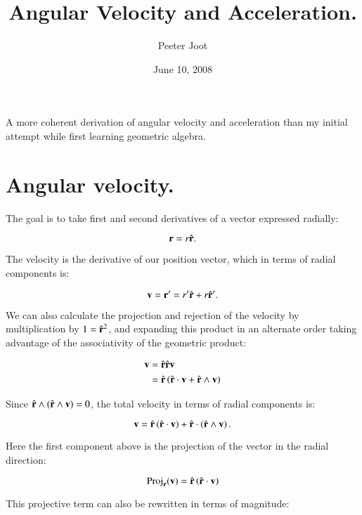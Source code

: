 \documentclass{article}      %
\title{ Angular Velocity and Acceleration. } %
\author{Peeter Joot}         %
\date{June 10, 2008}        %
\begin{document}

\maketitle{}

A more coherent derivation of angular velocity and acceleration than
my initial attempt while first learning geometric algebra.

\section{ Angular velocity. }

The goal is to take first and second derivatives of a vector expressed radially:

\begin{equation}
\mathbf{r} = r \hat{\mathbf{r}}.
\end{equation}

The velocity is the derivative of our position vector, which in terms of radial components is:

\begin{equation}\label{eqn:velocityasrcapprime}
\mathbf{v} = \mathbf{r}' = r' \hat{\mathbf{r}} + r \hat{\mathbf{r}}'.
\end{equation}

We can also calculate the projection and rejection of the velocity by multiplication by $1 = \hat{\mathbf{r}}^2$, and expanding
this product in an alternate order taking advantage of the associativity of the geometric product:

\begin{align*}
\mathbf{v} &= \hat{\mathbf{r}} \hat{\mathbf{r}} \mathbf{v} \\
    &= \hat{\mathbf{r}} \left ( \hat{\mathbf{r}} \cdot \mathbf{v} + \hat{\mathbf{r}} \wedge \mathbf{v} \right) \\
\end{align*}

Since $\hat{\mathbf{r}} \wedge (\hat{\mathbf{r}} \wedge \mathbf{v}) = 0$, the total velocity in terms of radial components is:

\begin{equation}\label{eqn:velocityprojrej}
\mathbf{v} = \hat{\mathbf{r}} \left(\hat{\mathbf{r}} \cdot \mathbf{v}\right) + \hat{\mathbf{r}} \cdot \left(\hat{\mathbf{r}} \wedge \mathbf{v}\right).
\end{equation}

Here the first component above is the projection of the vector in the radial direction:

\[
\operatorname{Proj}_{\mathbf{r}}(\mathbf{v}) = \hat{\mathbf{r}} \left(\hat{\mathbf{r}} \cdot \mathbf{v}\right)
\]

This projective term can also be rewritten in terms of magnitude:
\end{document}
